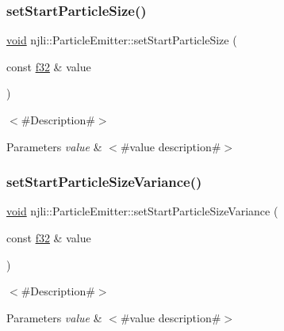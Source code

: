 \subsubsection{\texorpdfstring{set\+Start\+Particle\+Size()}{setStartParticleSize()}}
{\footnotesize\ttfamily \mbox{\hyperlink{_thread_8h_af1e856da2e658414cb2456cb6f7ebc66}{void}} njli\+::\+Particle\+Emitter\+::set\+Start\+Particle\+Size (\begin{DoxyParamCaption}\item[{const \mbox{\hyperlink{_util_8h_a5f6906312a689f27d70e9d086649d3fd}{f32}} \&}]{value }\end{DoxyParamCaption})}

$<$\#\+Description\#$>$


\begin{DoxyParams}{Parameters}
{\em value} & $<$\#value description\#$>$ \\
\hline
\end{DoxyParams}
\mbox{\label{classnjli_1_1_particle_emitter_acab2d66b1b889b9c3159207bb6d17a9d}} 
\subsubsection{\texorpdfstring{set\+Start\+Particle\+Size\+Variance()}{setStartParticleSizeVariance()}}
{\footnotesize\ttfamily \mbox{\hyperlink{_thread_8h_af1e856da2e658414cb2456cb6f7ebc66}{void}} njli\+::\+Particle\+Emitter\+::set\+Start\+Particle\+Size\+Variance (\begin{DoxyParamCaption}\item[{const \mbox{\hyperlink{_util_8h_a5f6906312a689f27d70e9d086649d3fd}{f32}} \&}]{value }\end{DoxyParamCaption})}

$<$\#\+Description\#$>$


\begin{DoxyParams}{Parameters}
{\em value} & $<$\#value description\#$>$ \\
\hline
\end{DoxyParams}
\mbox{\label{classnjli_1_1_particle_emitter_a0a95851c167af70c9b696d4e2ff34df2}} 
